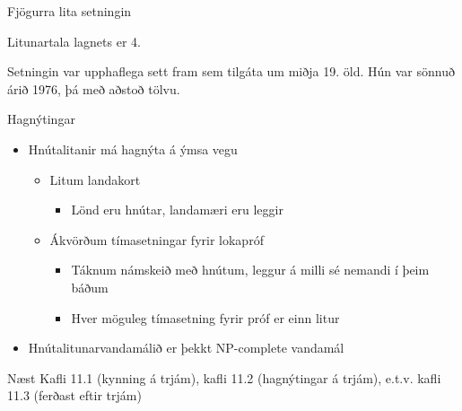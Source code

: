 \documentclass[handout]{beamer}
\begin{document}
\begin{frame}{Fjögurra lita setningin}
\begin{tcolorbox}[title=Fjögurra lita setningin]
Litunartala lagnets er 4.
\end{tcolorbox}
Setningin var upphaflega sett fram sem tilgáta um miðja 19. öld. Hún var sönnuð árið 1976, þá með aðstoð tölvu.
\end{frame}

\begin{frame}{Hagnýtingar}
\begin{itemize}
 \item Hnútalitanir má hagnýta á ýmsa vegu
 \begin{itemize}
  \item Litum landakort
  \begin{itemize}
   \item Lönd eru hnútar, landamæri eru leggir
  \end{itemize}
  \item Ákvörðum tímasetningar fyrir lokapróf
  \begin{itemize}
   \item Táknum námskeið með hnútum, leggur á milli sé nemandi í þeim báðum
   \item Hver möguleg tímasetning fyrir próf er einn litur
  \end{itemize}
 \end{itemize}
 \item Hnútalitunarvandamálið er þekkt NP-complete vandamál
\end{itemize}

\end{frame}


\begin{frame}{Næst}
Kafli 11.1 (kynning á trjám), kafli 11.2 (hagnýtingar á trjám), e.t.v. kafli 11.3 (ferðast eftir trjám)
\end{frame}
\end{document}

